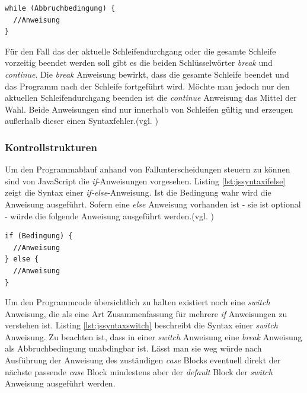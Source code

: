 	\vspace{1em}
	\begin{lstlisting}[frame=htrbl, caption=Syntax While-Schleife, label=lst:jssyntaxwhile]
while (Abbruchbedingung) {
  //Anweisung
}
	\end{lstlisting}
	
Für den Fall das der aktuelle Schleifendurchgang oder die gesamte Schleife vorzeitig beendet werden soll gibt es die beiden Schlüsselwörter \textit{break} und \textit{continue}. Die \textit{break} Anweisung bewirkt, dass die gesamte Schleife beendet und das Programm nach der Schleife fortgeführt wird. Möchte man jedoch nur den aktuellen Schleifendurchgang beenden ist die \textit{continue} Anweisung das Mittel der Wahl. Beide Anweisungen sind nur innerhalb von Schleifen gültig und erzeugen außerhalb dieser einen Syntaxfehler.(vgl. \cite[S.103f]{FlanJava2007})

\subsubsection{Kontrollstrukturen} Um den Programmablauf anhand von Fallunterscheidungen steuern zu können sind von JavaScript die \textit{if}-Anweisungen vorgesehen. Listing \ref{lst:jssyntaxifelse} zeigt die Syntax einer \textit{if-else}-Anweisung. Ist die Bedingung wahr wird die Anweisung ausgeführt. Sofern eine \textit{else} Anweisung vorhanden ist - sie ist optional - würde die folgende Anweisung ausgeführt werden.(vgl. \cite[S.80]{WenzJava2008})

	\vspace{1em}
	\begin{lstlisting}[frame=htrbl, caption=Syntax If-else-Anweisung, label=lst:jssyntaxifelse]
if (Bedingung) {
  //Anweisung
} else {
  //Anweisung
}
	\end{lstlisting}
	
Um den Programmcode übersichtlich zu halten existiert noch eine \textit{switch} Anweisung, die als eine Art Zusammenfassung für mehrere \textit{if} Anweisungen zu verstehen ist. Listing \ref{lst:jssyntaxswitch} beschreibt die Syntax einer \textit{switch} Anweisung. Zu beachten ist, dass in einer \textit{switch} Anweisung eine \textit{break} Anweisung als Abbruchbedingung unabdingbar ist. Lässt man sie weg würde nach Ausführung der Anweisung des zuständigen \textit{case} Blocks eventuell direkt der nächste passende \textit{case} Block mindestens aber der \textit{default} Block der \textit{switch} Anweisung ausgeführt werden.

